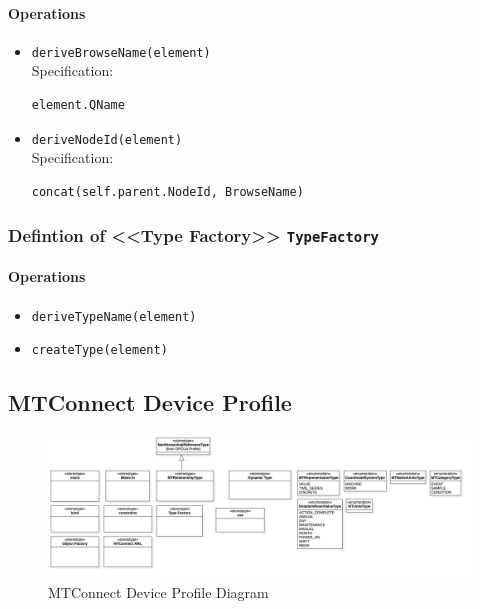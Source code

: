 \FloatBarrier



\paragraph{Operations}
\begin{itemize}
  \item \texttt{deriveBrowseName(element)}\\
    Specification:
   \indent \begin{Verbatim}[xleftmargin=.25in,fontsize=\small]
element.QName
\end{Verbatim}

  \item \texttt{deriveNodeId(element)}\\
    Specification:
   \indent \begin{Verbatim}[xleftmargin=.25in,fontsize=\small]
concat(self.parent.NodeId, BrowseName)
\end{Verbatim}

\end{itemize}
\subsubsection{Defintion of <<Type Factory>> \texttt{TypeFactory}} \label{type:TypeFactory}

\FloatBarrier



\paragraph{Operations}
\begin{itemize}
  \item \texttt{deriveTypeName(element)}
  \item \texttt{createType(element)}
\end{itemize}
\subsection{MTConnect Device Profile}

\begin{figure}
  \centering
    \includegraphics[width=1.0\textwidth]{diagrams/MTConnect Device Profile.png}
  \caption{MTConnect Device Profile Diagram}
  \label{fig:MTConnect Device Profile}
\end{figure}

